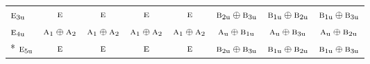 \documentclass[10pt,a4paper]{article}
\numberwithin{equation}{section}
\newcommand{\irr}[1]{\text{\normalfont\scshape #1}}
\newcommand{\ptag}[1]{\mathrm{#1}}
\begin{document}
{\begin{longtable}{@{}lccccccc@{}}
$\irr{e}_{3\ptag{u}}$ & $\irr{e}$ & $\irr{e}$ & $\irr{e}$ & $\irr{e}$ & $\irr{b}_{2\ptag{u}}\oplus \irr{b}_{3\ptag{u}}$ & $\irr{b}_{1\ptag{u}}\oplus \irr{b}_{2\ptag{u}}$ & $\irr{b}_{1\ptag{u}}\oplus \irr{b}_{3\ptag{u}}$\\
$\irr{e}_{4\ptag{u}}$ & $\irr{a}_{1}\oplus \irr{a}_{2}$ & $\irr{a}_{1}\oplus \irr{a}_{2}$ & $\irr{a}_{1}\oplus \irr{a}_{2}$ & $\irr{a}_{1}\oplus \irr{a}_{2}$ & $\irr{a}_{\ptag{u}}\oplus \irr{b}_{1\ptag{u}}$ & $\irr{a}_{\ptag{u}}\oplus \irr{b}_{3\ptag{u}}$ & $\irr{a}_{\ptag{u}}\oplus \irr{b}_{2\ptag{u}}$\\*
$\irr{e}_{5\ptag{u}}$ & $\irr{e}$ & $\irr{e}$ & $\irr{e}$ & $\irr{e}$ & $\irr{b}_{2\ptag{u}}\oplus \irr{b}_{3\ptag{u}}$ & $\irr{b}_{1\ptag{u}}\oplus \irr{b}_{2\ptag{u}}$ & $\irr{b}_{1\ptag{u}}\oplus \irr{b}_{3\ptag{u}}$\\
\bottomrule\end{longtable}}
\end{document}
